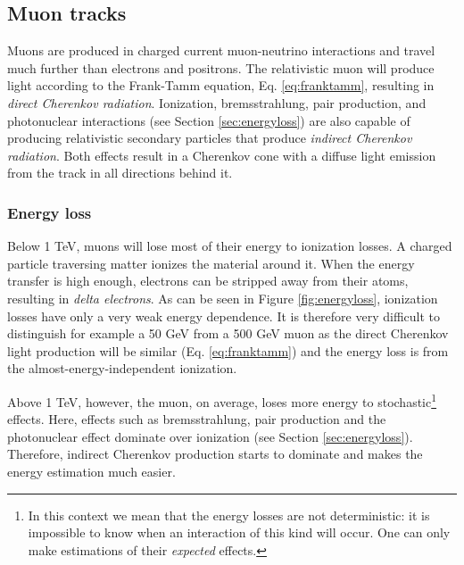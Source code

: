\subsection{Muon tracks}
Muons are produced in charged current muon-neutrino interactions and travel much further than electrons and positrons. The relativistic muon will produce light according to the Frank-Tamm equation, Eq. \ref{eq:franktamm}, resulting in \textit{direct Cherenkov radiation}. Ionization, bremsstrahlung, pair production, and photonuclear interactions (see Section \ref{sec:energyloss}) are also capable of producing relativistic secondary particles that produce \textit{indirect Cherenkov radiation}. Both effects result in a Cherenkov cone with a diffuse light emission from the track in all directions behind it. 

\subsubsection{Energy loss}
\label{subsub:energyloss}
Below 1 TeV, muons will lose most of their energy to ionization losses. A charged particle traversing matter ionizes the material around it. When the energy transfer is high enough, electrons can be stripped away from their atoms, resulting in \textit{delta electrons}. As can be seen in Figure \ref{fig:energyloss}, ionization losses have only a very weak energy dependence. It is therefore very difficult to distinguish for example a 50 GeV from a 500 GeV muon as the direct Cherenkov light production will be similar (Eq. \ref{eq:franktamm}) and the energy loss is from the almost-energy-independent ionization.

Above 1 TeV, however, the muon, on average, loses more energy to stochastic\footnote{In this context we mean that the energy losses are not deterministic: it is impossible to know when an interaction of this kind will occur. One can only make estimations of their \textit{expected} effects.} effects. Here, effects such as bremsstrahlung, pair production and the photonuclear effect dominate over ionization (see Section \ref{sec:energyloss}). Therefore, indirect Cherenkov production starts to dominate and makes the energy estimation much easier.\\

